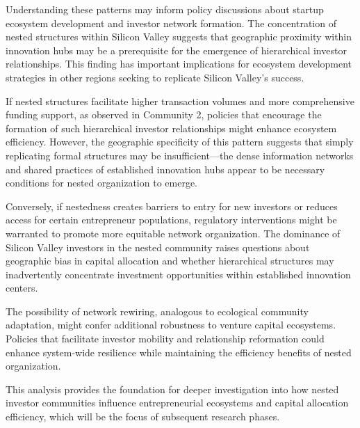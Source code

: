 Understanding these patterns may inform policy discussions about startup ecosystem development and investor network formation. The concentration of nested structures within Silicon Valley suggests that geographic proximity within innovation hubs may be a prerequisite for the emergence of hierarchical investor relationships. This finding has important implications for ecosystem development strategies in other regions seeking to replicate Silicon Valley's success.

If nested structures facilitate higher transaction volumes and more comprehensive funding support, as observed in Community 2, policies that encourage the formation of such hierarchical investor relationships might enhance ecosystem efficiency. However, the geographic specificity of this pattern suggests that simply replicating formal structures may be insufficient—the dense information networks and shared practices of established innovation hubs appear to be necessary conditions for nested organization to emerge.

Conversely, if nestedness creates barriers to entry for new investors or reduces access for certain entrepreneur populations, regulatory interventions might be warranted to promote more equitable network organization. The dominance of Silicon Valley investors in the nested community raises questions about geographic bias in capital allocation and whether hierarchical structures may inadvertently concentrate investment opportunities within established innovation centers.

The possibility of network rewiring, analogous to ecological community adaptation, might confer additional robustness to venture capital ecosystems. Policies that facilitate investor mobility and relationship reformation could enhance system-wide resilience while maintaining the efficiency benefits of nested organization.

This analysis provides the foundation for deeper investigation into how nested investor communities influence entrepreneurial ecosystems and capital allocation efficiency, which will be the focus of subsequent research phases.



